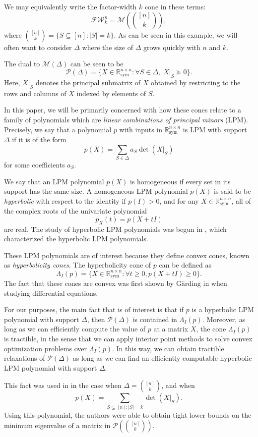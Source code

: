 \documentclass{amsart}
\theoremstyle{definition}
\newcommand{\R}{\mathbb{R}}
\newcommand{\FW}{\mathcal{F}\mathcal{W}}
\renewcommand{\P}{\mathcal{P}}
\newcommand{\M}{\mathcal{M}}
\newcommand*{\Sym}{\R^{n \times n}_{\mathrm{sym}}}
\begin{document}
We may equivalently write the factor-width $k$ cone in these terms:
\[
    \FW^n_k = \M\left(\binom{[n]}{k}\right),
\]
where $\binom{[n]}{k} = \{S \subseteq [n] : |S| = k\}$.
As can be seen in this example, we will often want to consider $\Delta$ where the size of $\Delta$ grows quickly with $n$ and $k$.

The dual to $\M(\Delta)$ can be seen to be 
\[
    \P(\Delta) = \{X \in \Sym : \forall S \in \Delta,\;X|_S \succeq 0\}.
\]
Here, $X|_S$ denotes the principal submatrix of $X$ obtained by restricting to the rows and columns of $X$ indexed by elements of $S$.

In this paper, we will be primarily concerned with how these cones relate to a family of polynomials which are \emph{linear combinations of principal minors} (LPM).
Precisely, we say that a polynomial $p$ with inputs in $\Sym$ is LPM with support $\Delta$ if it is of the form
\[
    p(X) = \sum_{S \in \Delta} a_S\det(X|_S)
\]
for some coefficients $a_S$.

We say that an LPM polynomial $p(X)$ is homogeneous if every set in its support has the same size.
A homogeneous LPM polynomial $p(X)$ is said to be \emph{hyperbolic} with respect to the identity if $p(I) > 0$, and for any $X \in \Sym$, all of the complex roots of the univariate polynomial
\[
    p_X(t) = p(X + tI)
\]
are real.
The study of hyperbolic LPM polynomials was begun in \cite{TODO}, which characterized the hyperbolic LPM polynomials.

These LPM polynomials are of interest because they define convex cones, known as \emph{hyperbolicity cones}. The hyperbolicity cone of $p$ can be defined as 
\[
    \Lambda_I(p) = \{X \in \Sym : \forall t \ge 0, p(X + t I) \ge 0\}.
\]
The fact that these cones are convex was first shown by G\"arding in \cite{TODO} when studying differential equations.

For our purposes, the main fact that is of interest is that if $p$ is a hyperbolic LPM polynomial with support $\Delta$, then $\P(\Delta)$ is contained in $\Lambda_I(p)$.
Moreover, as long as we can efficiently compute the value of $p$ at a matrix $X$, the cone $\Lambda_I(p)$ is tractible, in the sense that we can apply interior point methods to solve convex optimization problems over $\Lambda_I(p)$.
In this way, we can obtain tractible relaxations of $\P(\Delta)$ as long as we can find an efficiently computable hyperbolic LPM polynomial with support $\Delta$.

This fact was used in \cite{TODO} in the case when $\Delta = \binom{[n]}{k}$, and when 
\[
    p(X) = \sum_{S \subseteq [n] : |S| = k} \det(X|_S).
\]
Using this polynomial, the authors were able to obtain tight lower bounds on the minimum eigenvalue of a matrix in $\P(\binom{[n]}{k})$.
\end{document}
